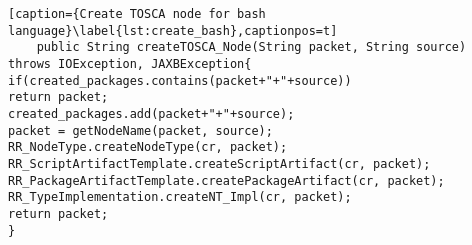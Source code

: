 \begin{lstlisting}[caption={Create TOSCA node for bash language}\label{lst:create_bash},captionpos=t] 
	public String createTOSCA_Node(String packet, String source) throws IOException, JAXBException{
if(created_packages.contains(packet+"+"+source))
return packet;
created_packages.add(packet+"+"+source);
packet = getNodeName(packet, source);
RR_NodeType.createNodeType(cr, packet);
RR_ScriptArtifactTemplate.createScriptArtifact(cr, packet);
RR_PackageArtifactTemplate.createPackageArtifact(cr, packet);
RR_TypeImplementation.createNT_Impl(cr, packet);
return packet;
}
\end{lstlisting}